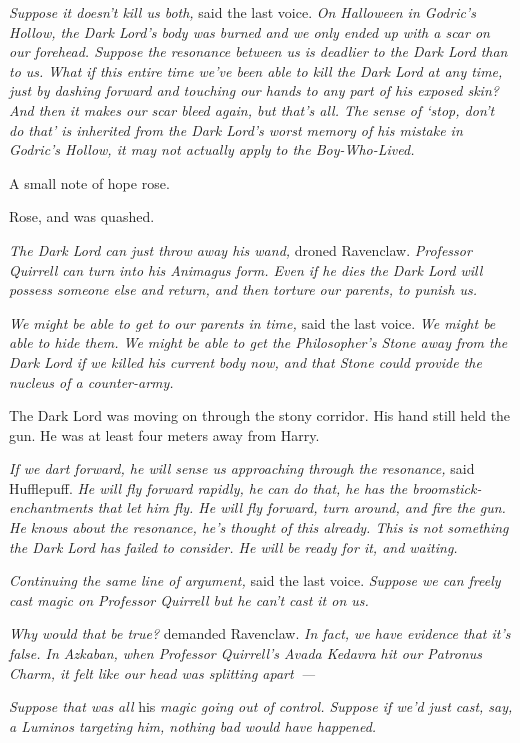 \emph{Suppose it doesn't kill us both,} said the last voice. \emph{On Halloween
in Godric's Hollow, the Dark Lord's body was burned and we only ended up with a
scar on our forehead. Suppose the resonance between us is deadlier to the Dark
Lord than to us. What if this entire time we've been able to kill the Dark Lord
at any time, just by dashing forward and touching our hands to any part of his
exposed skin? And then it makes our scar bleed again, but that's all. The sense
of `stop, don't do that' is inherited from the Dark Lord's worst memory of his
mistake in Godric's Hollow, it may not actually apply to the Boy-Who-Lived.}

A small note of hope rose.

Rose, and was quashed.

\emph{The Dark Lord can just throw away his wand,} droned Ravenclaw.
\emph{Professor Quirrell can turn into his Animagus form. Even if he dies the
Dark Lord will possess someone else and return, and then torture our parents,
to punish us.}

\emph{We might be able to get to our parents in time,} said the last voice.
\emph{We might be able to hide them. We might be able to get the Philosopher's
Stone away from the Dark Lord if we killed his current body now, and that Stone
could provide the nucleus of a counter-army.}

The Dark Lord was moving on through the stony corridor. His hand still held the
gun. He was at least four meters away from Harry.

\emph{If we dart forward, he will sense us approaching through the resonance,}
said Hufflepuff. \emph{He will fly forward rapidly, he can do that, he has the
broomstick-enchantments that let him fly. He will fly forward, turn around, and
fire the gun. He knows about the resonance, he's thought of this already. This
is not something the Dark Lord has failed to consider. He will be ready for it,
and waiting.}

\emph{Continuing the same line of argument,} said the last voice. \emph{Suppose
we can freely cast magic on Professor Quirrell but he can't cast it on us.}

\emph{Why would that be true?} demanded Ravenclaw. \emph{In fact, we have
evidence that it's false. In Azkaban, when Professor Quirrell's Avada Kedavra
hit our Patronus Charm, it felt like our head was splitting apart~--- }

\emph{Suppose that was all} his \emph{magic going out of control. Suppose if
we'd just cast, say, a Luminos targeting him, nothing bad would have happened.}

